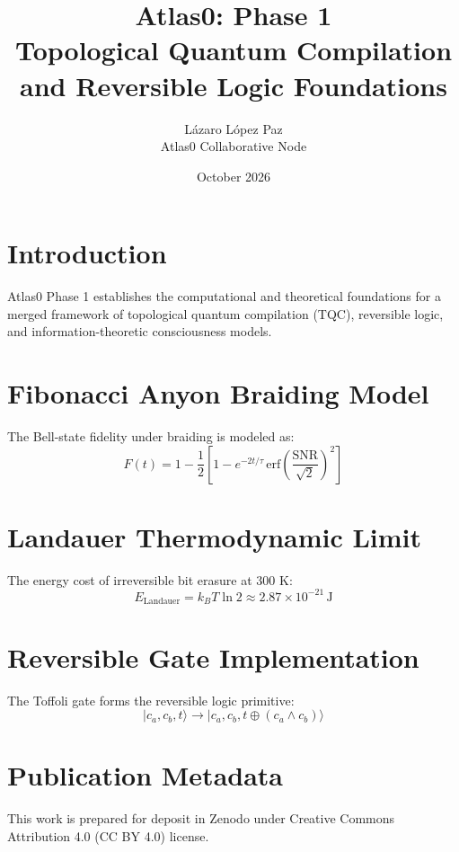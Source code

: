 \documentclass[11pt,a4paper]{article}
\title{Atlas0: Phase 1 \\ Topological Quantum Compilation and Reversible Logic Foundations}
\author{Lázaro López Paz \\ Atlas0 Collaborative Node}
\date{October 2026}
\begin{document}
\maketitle

\section{Introduction}

Atlas0 Phase 1 establishes the computational and theoretical foundations for a merged framework of topological quantum compilation (TQC), reversible logic, and information-theoretic consciousness models.

\section{Fibonacci Anyon Braiding Model}

The Bell-state fidelity under braiding is modeled as:
\begin{equation}
F(t) = 1 - \frac{1}{2}\left[1 - e^{-2t/\tau}\,\mathrm{erf}\left(\frac{\mathrm{SNR}}{\sqrt{2}}\right)^2\right]
\end{equation}

\section{Landauer Thermodynamic Limit}

The energy cost of irreversible bit erasure at 300 K:
\begin{equation}
E_{\mathrm{Landauer}} = k_B T \ln 2 \approx 2.87 \times 10^{-21}\,\mathrm{J}
\end{equation}

\section{Reversible Gate Implementation}

The Toffoli gate forms the reversible logic primitive:
\[
|c_a, c_b, t\rangle \to |c_a, c_b, t \oplus (c_a \land c_b)\rangle
\]

\section{Publication Metadata}

This work is prepared for deposit in Zenodo under Creative Commons Attribution 4.0 (CC BY 4.0) license.



\end{document}
